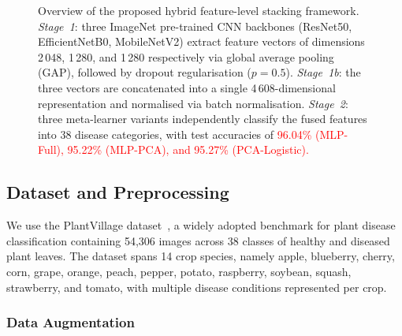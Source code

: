 \documentclass[pdflatex,sn-basic]{sn-jnl}
\begin{document}
\begin{figure}[htbp]
{
}
\caption{Overview of the proposed hybrid feature-level stacking framework.
\textit{Stage~1}: three ImageNet pre-trained CNN backbones (ResNet50,
EfficientNetB0, MobileNetV2) extract feature vectors of dimensions
2\,048, 1\,280, and 1\,280 respectively via global average pooling (GAP),
followed by dropout regularisation ($p = 0.5$).
\textit{Stage~1b}: the three vectors are concatenated into a single
4\,608-dimensional representation and normalised via batch normalisation.
\textit{Stage~2}: three meta-learner variants independently classify the
fused features into 38 disease categories, with test accuracies of
\textcolor{red}{96.04\% (MLP-Full), 95.22\% (MLP-PCA), and 95.27\% (PCA-Logistic).}}
\label{fig:architecture}
\end{figure}

\subsection{Dataset and Preprocessing}
\label{subsec:preprocessing}

We use the PlantVillage dataset~\cite{plantvillage}, a widely adopted benchmark for plant disease classification containing 54,306 images across 38 classes of healthy and diseased plant leaves. The dataset spans 14 crop species, namely apple, blueberry, cherry, corn, grape, orange, peach, pepper, potato, raspberry, soybean, squash, strawberry, and tomato, with multiple disease conditions represented per crop.

\subsubsection{Data Augmentation}
\end{document}
